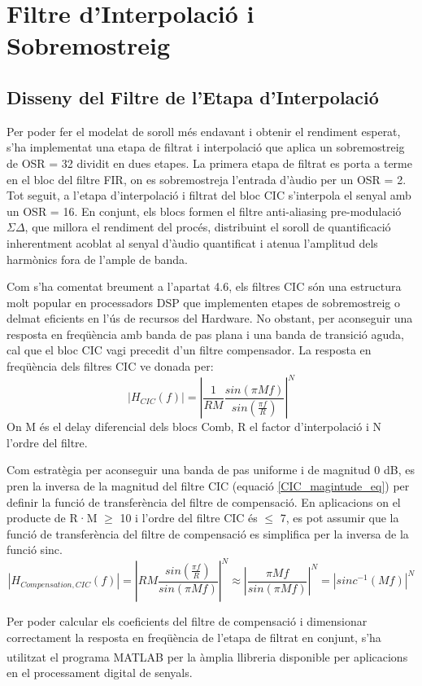 \chapter{Filtre d'Interpolació i Sobremostreig}
\section{Disseny del Filtre de l'Etapa d'Interpolació}
\par Per poder fer el modelat de soroll més endavant i obtenir el rendiment esperat, s'ha implementat una etapa de filtrat i interpolació que aplica un sobremostreig de OSR = 32 dividit en dues etapes. La primera etapa de filtrat es porta a terme en el bloc del filtre FIR, on es sobremostreja l'entrada d'àudio per un OSR = 2. Tot seguit, a l'etapa d'interpolació i filtrat del bloc CIC s'interpola el senyal amb un OSR = 16. En conjunt, els blocs formen el filtre anti-aliasing pre-modulació $\Sigma\Delta$, que millora el rendiment del procés, distribuint el soroll de quantificació inherentment acoblat al senyal d'àudio quantificat i atenua l'amplitud dels harmònics fora de l'ample de banda.    
\par Com s'ha comentat breument a l'apartat 4.6, els filtres CIC són una estructura molt popular en processadors DSP que implementen etapes de sobremostreig o delmat eficients en l'ús de recursos del Hardware. No obstant, per aconseguir una resposta en freqüència amb banda de pas plana i una banda de transició aguda, cal que el bloc CIC vagi precedit d'un filtre compensador. La resposta en freqüència dels filtres CIC ve donada per:
\begin{equation}\label{CIC_magintude_eq}
    \left| H_{CIC}(f) \right| = \left|\frac{1}{RM}\frac{sin(\pi Mf)}{sin(\frac{\pi f}{R})}\right|^N
\end{equation}
On M és el delay diferencial dels blocs Comb, R el factor d'interpolació i N l'ordre del filtre.
\par Com estratègia per aconseguir una banda de pas uniforme i de magnitud 0 dB, es pren la inversa de la magnitud del filtre CIC (equació \ref{CIC_magintude_eq}) per definir la funció de transferència del filtre de compensació. En aplicacions on el producte de R·M $\geq$ 10 i l'ordre del filtre CIC és $\leq$ 7, es pot assumir que la funció de transferència del filtre de compensació es simplifica per la inversa de la funció sinc.\cite{AN455}\cite{Hogenauer1981}
\begin{equation}\label{CIC_compensation_filter_eq}
    \left| H_{Compensation,CIC}(f) \right| = \left|RM\frac{sin(\frac{\pi f}{R})}{sin(\pi Mf)}\right|^N \approx \left| \frac{\pi Mf}{sin(\pi Mf)} \right| ^N = \left|sinc^{-1}(Mf) \right|^N
\end{equation}
\par Per poder calcular els coeficients del filtre de compensació i dimensionar correctament la resposta en freqüència de l'etapa de filtrat en conjunt, s'ha utilitzat el programa MATLAB\textsuperscript{\tiny\textregistered} per la àmplia llibreria disponible per aplicacions en el processament digital de senyals. 
